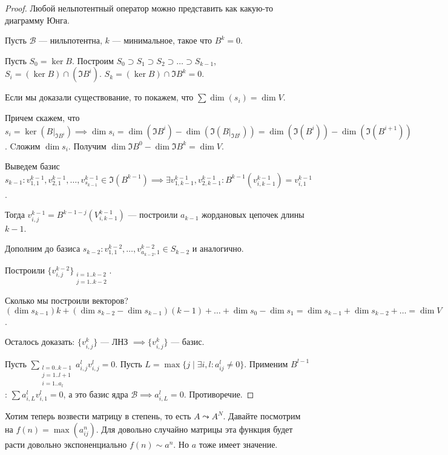 \begin{proof}
    Любой нельпотентный оператор можно представить как какую-то диаграмму Юнга. 

    Пусть $\mathcal{B}$ --- нильпотентна,  $k$ --- минимальное, такое что  $B^k = 0$. 

    Пусть  $S_0 = \ker B$. Построим  $S_0 \supset S_1 \supset S_2 \supset \ldots \supset S_{k-1}$, $S_i = (\ker B) \cap (\Im B^i)$. $S_k = (\ker B) \cap \Im B^k = 0$.
    
    Если мы доказали существование, то покажем, что  $\sum \dim (s_i) = \dim V$.

    Причем скажем, что $s_i = \ker(B \Big|_{\Im B^i}) \implies \dim s_i = \dim (\Im B^i) - \dim(\Im(B\Big|_{\Im B^i})) = \dim (\Im (B^i)) - \dim(\Im(B^{i+1}))$. Cложим  $\dim s_i$. Получим  $\dim \Im B^0 - \dim \Im B^k = \dim V$. 

    Выведем базис $s_{k-1}\!: v_{1,1}^{k-1}, v_{2, 1}^{k-1}, \ldots, v_{s_{k-1}}^{k-1} \in \Im(B^{k-1}) \implies \exists v_{1, k-1}^{k-1}, v_{2, k - 1}^{k-1}\!: B^{k-1} (v_{i, k - 1}^{k-1}) = v_{i, 1}^{k-1}$.

    Тогда $v_{i,j}^{k-1} = B^{k-1-j}(V_{i, k-1}^{k-1})$ --- построили  $a_{k-1}$ жордановых цепочек длины  $k-1$. 

    Дополним до базиса $s_{k-2}\!: v_{1,1}^{k-2}, \ldots, v_{a_{k-2}, 1}^{k-2} \in S_{k-2}$ и аналогично.

    Построили $\{v_{i, j}^{k-2}\}_{\substack{i=1..k-2\\j=1..k-2}}$. 

    Сколько мы построили векторов? $(\dim s_{k-1}) k + (\dim s_{k-2} - \dim s_{k-1})(k-1) + \ldots + \dim s_0 - \dim s_1 = \dim s_{k-1} + \dim s_{k-2} + \ldots = \dim V$.

    Осталось доказать: $\{v_{i, j}^k\}$ --- ЛНЗ  $\implies \{v_{i, j}^k\}$ --- базис.

    Пусть  $\sum_{\substack{l=0..k-1\\j=1..l+1\\i=1..a_l}} a_{i, j}^l v_{i, j}^l = 0$. Пусть  $L = \max\{j \mid \exists i, l\!: a_{ij}^l \neq 0\}$. Применим  $B^{l-1}$:  $\sum a_{i, L}^l v_{i, 1}^l = 0$, а это базис ядра  $\mathcal{B} \implies a_{i, L}^l = 0$. Противоречие. 
\end{proof}

Хотим теперь возвести матрицу в степень, то есть $A \leadsto A^N$. Давайте посмотрим на  $f(n) = \max(a_{ij}^n)$. Для довольно случайно матрицы эта функция будет расти довольно экспоненциально $f(n) \sim a^n$. Но $a$ тоже имеет значение.

